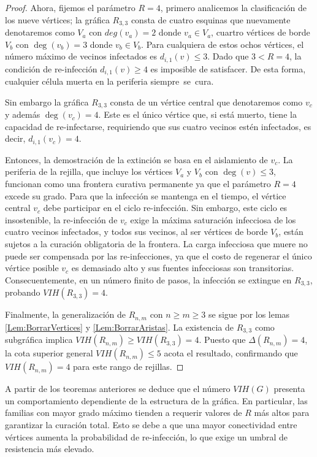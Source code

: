 \documentclass[12pt,titlepage,twoside,openright]{book}
\begin{document}
\begin{proof}
    Ahora, fijemos el par\'ametro $R=4$, primero analicemos la clasificaci\'on de los nueve v\'ertices; la gr\'afica $R_{3,3}$ consta de cuatro esquinas que nuevamente denotaremos como $V_a$ con $deg(v_a)=2$ donde $v_a \in V_a$, cuartro v\'ertices de borde $V_b$ con $\deg(v_b)=3$ donde $v_b \in V_b$. Para cualquiera de estos ochos v\'ertices, el n\'umero m\'aximo de vecinos infectados es $d_{i,1}(v) \le 3$. Dado que $3 < R=4$, la condici\'on de re-infecci\'on $d_{i,1}(v) \ge 4$ es imposible de satisfacer. De esta forma, cualquier c\'elula muerta en la periferia siempre\ se\ cura.

    Sin embargo la gr\'afica $R_{3,3}$ consta de un v\'ertice central que denotaremos como $v_c$ y adem\'as $\deg(v_c)=4$. Este es el \'unico v\'ertice que, si est\'a muerto, tiene la capacidad de re-infectarse, requiriendo que sus cuatro vecinos est\'en infectados, es decir, $d_{i,1}(v_c)=4$.

    Entonces, la demostraci\'on de la extinci\'on se basa en el aislamiento de $v_c$. La periferia de la rejilla, que incluye los v\'ertices $V_a$ y $V_b$ con $\deg(v) \le 3$, funcionan como una frontera curativa permanente ya que el par\'ametro $R=4$ excede su grado. Para que la infecci\'on se mantenga en el tiempo, el v\'ertice central $v_c$ debe participar en el ciclo re-infecci\'on. Sin embargo, este ciclo es insostenible, la re-infecci\'on de $v_c$ exige la m\'axima saturaci\'on infecciosa de los cuatro vecinos infectados, y todos sus vecinos, al ser v\'ertices de borde $V_b$, est\'an sujetos a la curaci\'on obligatoria de la frontera. La carga infecciosa que muere no puede ser compensada por las re-infecciones, ya que el costo de regenerar el \'unico v\'ertice posible $v_c$ es demasiado alto y sus fuentes infecciosas son transitorias. Consecuentemente, en un n\'umero finito de pasos, la infecci\'on se extingue en $R_{3,3}$, probando $VIH(R_{3,3}) = 4$.

    Finalmente, la generalizaci\'on de $R_{n,m}$ con $n \ge m \ge 3$ se sigue por los lemas \ref{Lem:BorrarVertices} y \ref{Lem:BorrarAristas}. La existencia de $R_{3,3}$ como subgr\'afica implica $VIH(R_{n,m}) \ge VIH(R_{3,3}) = 4$. Puesto que $\Delta(R_{n,m})=4$, la cota superior general $VIH(R_{n,m}) \le 5$ acota el resultado, confirmando que $VIH(R_{n,m})=4$ para este rango de rejillas.
    
\end{proof}

A partir de los teoremas anteriores se deduce que el n\'umero $VIH(G)$ presenta un comportamiento dependiente de la estructura de la gr\'afica. En particular, las familias con mayor grado m\'aximo tienden a requerir valores de $R$ m\'as altos para garantizar la curaci\'on total. Esto se debe a que una mayor conectividad entre v\'ertices aumenta la probabilidad de re-infecci\'on, lo que exige un umbral de resistencia m\'as elevado.
\end{document}
